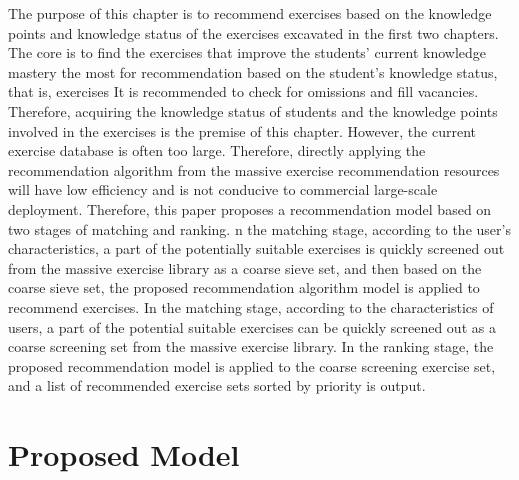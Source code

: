 The purpose of this chapter is to recommend exercises based on the knowledge points and knowledge status of the exercises excavated in the first two chapters. The core is to find the exercises that improve the students' current knowledge mastery the most for recommendation based on the student's knowledge status, that is, exercises It is recommended to check for omissions and fill vacancies. Therefore, acquiring the knowledge status of students and the knowledge points involved in the exercises is the premise of this chapter. However, the current exercise database is often too large. Therefore, directly applying the recommendation algorithm from the massive exercise recommendation resources will have low efficiency and is not conducive to commercial large-scale deployment. Therefore, this paper proposes a recommendation model based on two stages of matching and ranking. n the matching stage, according to the user's characteristics, a part of the potentially suitable exercises is quickly screened out from the massive exercise library as a coarse sieve set, and then based on the coarse sieve set, the proposed recommendation algorithm model is applied to recommend exercises. In the matching stage, according to the characteristics of users, a part of the potential suitable exercises can be quickly screened out as a coarse screening set from the massive exercise library. In the ranking stage, the proposed recommendation model is applied to the coarse screening exercise set, and a list of recommended exercise sets sorted by priority is output.

\section{Proposed Model}

